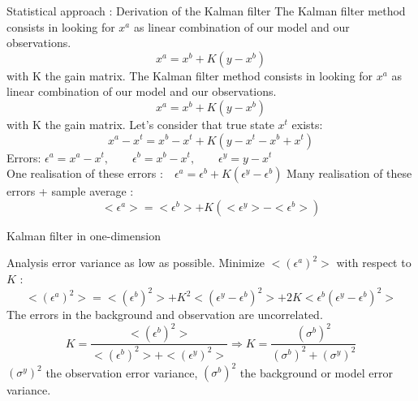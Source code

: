    \begin{frame}[allowframebreaks]{Statistical approach : Derivation of the Kalman filter}
       The Kalman filter method consists in looking for $x^a$ as linear combination of our model and our observations.
       \begin{equation*}
           x^a=x^b+K(y-x^b)
           \label{eq1}
       \end{equation*}
       with K the gain matrix.
    \newpage
        The Kalman filter method consists in looking for $x^a$ as linear combination of our model and our observations.
       \begin{equation}
           x^a=x^b+K(y-x^b)
           \label{eq1}
       \end{equation}
       with K the gain matrix.
       \newline Let’s consider that true state $x^t$ exists:
       \begin{equation}
           x^a-x^t=x^b-x^t+K(y-x^t-x^b+x^t)
       \end{equation}
       Errors: \qquad $\epsilon^a=x^a-x^t,\qquad \epsilon^b=x^b-x^t, \qquad \epsilon^y=y-x^t$ \\
       One realisation of these errors :$ \quad \epsilon^a=\epsilon^b+K(\epsilon^y-\epsilon^b)$
       Many realisation of these errors + sample average :
       \begin{equation}
           <\epsilon^a>=<\epsilon^b>+K(<\epsilon^y>-<\epsilon^b>)
       \end{equation}
    \end{frame}
    \begin{frame}{Kalman filter in one-dimension}

       Analysis error variance as low as possible.
       \newline Minimize $<(\epsilon^a)^2>$ with respect to $K$ :
       $$<(\epsilon^a)^2>=<(\epsilon^b)^2>+K^2<(\epsilon^y-\epsilon^b)^2>+2K<\epsilon^b(\epsilon^y-\epsilon^b)^2>$$
       The errors in the background and observation are uncorrelated.
       $$K=\frac{<(\epsilon^b)^2>}{<(\epsilon^b)^2>+<(\epsilon^y)^2>} \Rightarrow K=\frac{(\sigma^b)^2}{(\sigma^b)^2+(\sigma^y)^2} $$
       $(\sigma^y)^2$ the observation error variance, \newline $(\sigma^b)^2$ the background or model error variance.
   
	\end{frame}
       

